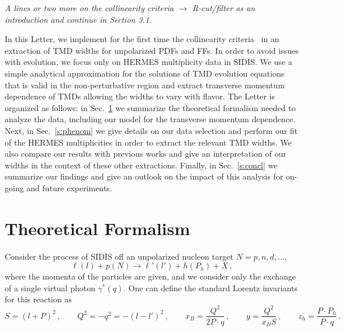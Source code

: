 \documentclass[final,3p,times,onecolumn,sort&compress,hidelinks]{elsarticle}
\newcommand\3[1]{\boldsymbol{#1}}
\begin{document}
\begin{flushleft}  
  {\em A lines or two more on the collinearity criteria $\rightarrow$ R-cut/filter as an introduction and continue in Section 3.1}.
  \end{flushleft}

  
In this Letter, we  implement for the first time the collinearity criteria~\cite{Boglione:2016bph} in an extraction of TMD widths for unpolarized PDFs and FFs.  In order to avoid issues with evolution, we focus only on HERMES multiplicity data in SIDIS.  We use a simple analytical approximation for the solutions of TMD evolution equations that is valid in the non-perturbative region and  extract transverse momentum dependence of TMDs allowing the widths to vary with flavor.  The Letter is organized as follows: in Sec.~\ref{s:model} we summarize the theoretical formalism needed to analyze the data, including our model for the transverse momentum dependence.  Next, in Sec.~\ref{s:phenom} we give details on our data selection and perform our fit of the HERMES multiplicities in order to extract the relevant TMD widths.  We also compare our results with previous works and give an interpretation of our widths in the context of these other extractions.  Finally, in Sec.~\ref{s:concl} we summarize our findings and give an outlook on the impact of this analysis for on-going and future experiments.



\section{Theoretical Formalism}
\label{s:model}
Consider the process of SIDIS off an unpolarized nucleon target $N=p,n,d,...$,
\begin{equation}
\ell(l)+p(N)\to \ell'(l') + h(P_h) + X\,,
\end{equation}
where the momenta of the particles are given, and we consider only the exchange of a single virtual photon $\gamma^*(q)$.  One can define the standard Lorentz invariants for this reaction as
\begin{equation}
S = (l+P)^2\,, \quad\quad Q^2 = -q^2 = -(l-l')^2\,, \quad\quad x_B = \frac{Q^2} {2P\cdot q}\,, \quad\quad y = \frac{Q^2} {x_B S}\,, \quad\quad z_h = \frac{P\cdot P_h} {P\cdot q}\,.
\end{equation}
\end{document}
